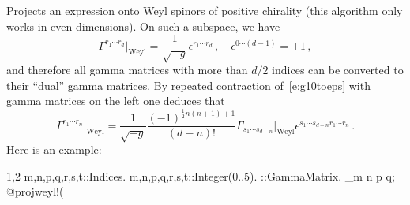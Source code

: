 
Projects an expression onto Weyl spinors of positive chirality (this
algorithm only works in even dimensions). On such a subspace, we have
\begin{equation}
\label{e:g10toeps}
\Gamma^{r_1 \cdots r_{d}}\Big|_{\text{Weyl}} = \frac{1}{\sqrt{-g}}\epsilon^{r_1\cdots
r_{d}}
\, ,\quad \epsilon^{0\cdots (d-1)} = +1\, ,
\end{equation}
and therefore all gamma matrices with more than $d/2$ indices can be
converted to their ``dual'' gamma matrices. By repeated contraction
of~\eqref{e:g10toeps} with gamma matrices on the left one deduces that
\begin{equation}
\Gamma^{r_1\cdots r_n}\Big|_{\text{Weyl}} = \frac{1}{\sqrt{-g}} \frac{(-1)^{\frac{1}{2}n(n+1)+1}}{(d-n)!}
\Gamma_{s_1\cdots s_{d-n}}\Big|_{\text{Weyl}} \epsilon^{s_1\cdots s_{d-n} r_1\cdots r_n}\, .
\end{equation}
Here is an example:
\begin{screen}{1,2}
{m,n,p,q,r,s,t}::Indices.
{m,n,p,q,r,s,t}::Integer(0..5).
\Gamma{#}::GammaMatrix.
\Gamma_{m n p q};
@projweyl!(%
\end{screen}

